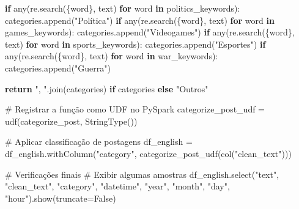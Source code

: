 \documentclass[
  letterpaper,
  DIV=11,
  numbers=noendperiod]{scrartcl}
\newenvironment{Shaded}{\begin{snugshade}}{\end{snugshade}}
\newcommand{\BuiltInTok}[1]{\textcolor[rgb]{0.00,0.23,0.31}{#1}}
\newcommand{\CommentTok}[1]{\textcolor[rgb]{0.37,0.37,0.37}{#1}}
\newcommand{\ControlFlowTok}[1]{\textcolor[rgb]{0.00,0.23,0.31}{\textbf{#1}}}
\newcommand{\KeywordTok}[1]{\textcolor[rgb]{0.00,0.23,0.31}{\textbf{#1}}}
\newcommand{\NormalTok}[1]{\textcolor[rgb]{0.00,0.23,0.31}{#1}}
\newcommand{\OperatorTok}[1]{\textcolor[rgb]{0.37,0.37,0.37}{#1}}
\newcommand{\SpecialCharTok}[1]{\textcolor[rgb]{0.37,0.37,0.37}{#1}}
\newcommand{\StringTok}[1]{\textcolor[rgb]{0.13,0.47,0.30}{#1}}
\newcommand{\VariableTok}[1]{\textcolor[rgb]{0.07,0.07,0.07}{#1}}
\begin{document}
\begin{Shaded}
\begin{Highlighting}[]
    \ControlFlowTok{if} \BuiltInTok{any}\NormalTok{(re.search(}\SpecialCharTok{\{}\NormalTok{word}\SpecialCharTok{\}}\NormalTok{, text) }\ControlFlowTok{for}\NormalTok{ word }\KeywordTok{in}\NormalTok{ politics\_keywords):}
\NormalTok{        categories.append(}\StringTok{"Política"}\NormalTok{)}
    \ControlFlowTok{if} \BuiltInTok{any}\NormalTok{(re.search(}\SpecialCharTok{\{}\NormalTok{word}\SpecialCharTok{\}}\NormalTok{, text) }\ControlFlowTok{for}\NormalTok{ word }\KeywordTok{in}\NormalTok{ games\_keywords):}
\NormalTok{        categories.append(}\StringTok{"Videogames"}\NormalTok{)}
    \ControlFlowTok{if} \BuiltInTok{any}\NormalTok{(re.search(}\SpecialCharTok{\{}\NormalTok{word}\SpecialCharTok{\}}\NormalTok{, text) }\ControlFlowTok{for}\NormalTok{ word }\KeywordTok{in}\NormalTok{ sports\_keywords):}
\NormalTok{        categories.append(}\StringTok{"Esportes"}\NormalTok{)}
    \ControlFlowTok{if} \BuiltInTok{any}\NormalTok{(re.search(}\SpecialCharTok{\{}\NormalTok{word}\SpecialCharTok{\}}\NormalTok{, text) }\ControlFlowTok{for}\NormalTok{ word }\KeywordTok{in}\NormalTok{ war\_keywords):}
\NormalTok{        categories.append(}\StringTok{"Guerra"}\NormalTok{)}
    
    \ControlFlowTok{return} \StringTok{", "}\NormalTok{.join(categories) }\ControlFlowTok{if}\NormalTok{ categories }\ControlFlowTok{else} \StringTok{"Outros"}

\CommentTok{\# Registrar a função como UDF no PySpark}
\NormalTok{categorize\_post\_udf }\OperatorTok{=}\NormalTok{ udf(categorize\_post, StringType())}

\CommentTok{\# Aplicar classificação de postagens}
\NormalTok{df\_english }\OperatorTok{=}\NormalTok{ df\_english.withColumn(}\StringTok{"category"}\NormalTok{, categorize\_post\_udf(col(}\StringTok{"clean\_text"}\NormalTok{)))}

\CommentTok{\# Verificações finais}
\CommentTok{\# Exibir algumas amostras}
\NormalTok{df\_english.select(}\StringTok{"text"}\NormalTok{, }\StringTok{"clean\_text"}\NormalTok{, }\StringTok{"category"}\NormalTok{, }\StringTok{"datetime"}\NormalTok{, }\StringTok{"year"}\NormalTok{, }\StringTok{"month"}\NormalTok{, }\StringTok{"day"}\NormalTok{, }\StringTok{"hour"}\NormalTok{).show(truncate}\OperatorTok{=}\VariableTok{False}\NormalTok{)}
\end{Highlighting}
\end{Shaded}
\end{document}
